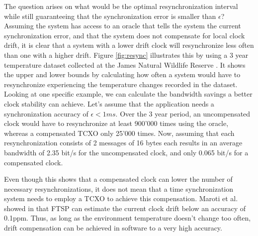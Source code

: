 The question arises on what would be the optimal resynchronization interval
while still guaranteeing that the synchronization error is smaller than
$\epsilon$? Assuming the system has access to an oracle that tells the system
the current synchronization error, and that the system does not compensate for
local clock drift, it is clear that a system with a lower drift clock will
resynchronize less often than one with a higher drift. Figure \ref{fig:resync}
illustrates this by using a 3 year temperature dataset collected at the James
Natural Wildlife Reserve \cite{mosscam}. It shows the upper and lower bounds
by calculating how often a system would have to resynchronize experiencing the
temperature changes recorded in the dataset. Looking at one specific example,
we can calculate the bandwidth savings a better clock stability can achieve.
Let's assume that the application needs a synchronization accuracy of
$\epsilon<1ms$. Over the 3 year period, an uncompensated clock would have to
resynchronize at least 900'000 times using the oracle, whereas a compensated
TCXO only 25'000 times. Now, assuming that each resynchronization consists of
2 messages of 16 bytes each results in an average bandwidth of 2.35 bit/s for
the uncompensated clock, and only 0.065 bit/s for a compensated clock.

Even though this shows that a compensated clock can lower the number of
necessary resynchronizations, it does not mean that a time synchronization
system needs to employ a TCXO to achieve this compensation. Maroti et al.
showed in \cite{maroti2004ftsp} that FTSP can estimate the current clock drift
below an accuracy of 0.1ppm. Thus, as long as the environment temperature
doesn't change too often, drift compensation can be achieved in software to a
very high accuracy.

